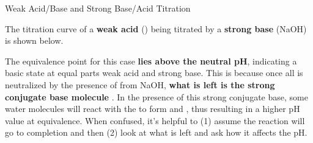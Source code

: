 \documentclass[10pt]{article}
\begin{document}
  \begin{core}{Weak Acid/Base and Strong Base/Acid Titration}

    The titration curve of a \textbf{weak acid} () being titrated by a \textbf{strong base} (NaOH) is shown below.


    The equivalence point for this case \textbf{lies above the neutral pH}, indicating a basic state at equal parts weak acid and strong base. This is because once all  is neutralized by the presence of  from NaOH, \textbf{what is left is the strong conjugate base molecule} . In the presence of this strong conjugate base, some water molecules will react with the  to form  and , thus resulting in a higher pH value at equivalence. When confused, it's helpful to (1) assume the reaction will go to completion and then (2) look at what is left and ask how it affects the pH.

  \end{core}
\end{document}
